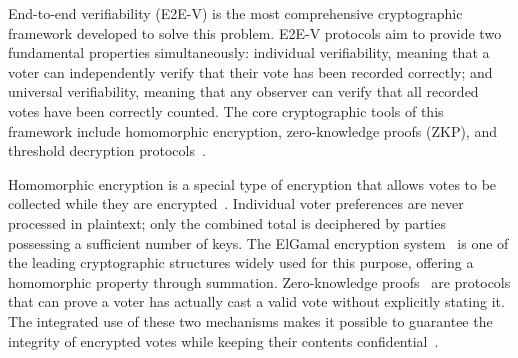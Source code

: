 \documentclass[a4paper,fleqn]{cas-sc}
\begin{document}

End-to-end verifiability (E2E-V) is the most comprehensive cryptographic framework developed to solve this problem. E2E-V protocols aim to provide two fundamental properties simultaneously: individual verifiability, meaning that a voter can independently verify that their vote has been recorded correctly; and universal verifiability, meaning that any observer can verify that all recorded votes have been correctly counted. The core cryptographic tools of this framework include homomorphic encryption, zero-knowledge proofs (ZKP), and threshold decryption protocols~\cite{Wu2023,Farzaliyev2025}.


Homomorphic encryption is a special type of encryption that allows votes to be collected while they are encrypted~\cite{Rivest1978}. Individual voter preferences are never processed in plaintext; only the combined total is deciphered by parties possessing a sufficient number of keys. The ElGamal encryption system~\cite{ElGamal1985} is one of the leading cryptographic structures widely used for this purpose, offering a homomorphic property through summation. Zero-knowledge proofs~\cite{Goldwasser1989} are protocols that can prove a voter has actually cast a valid vote without explicitly stating it. The integrated use of these two mechanisms makes it possible to guarantee the integrity of encrypted votes while keeping their contents 
confidential~\cite{Chaum1992}.
\end{document}
